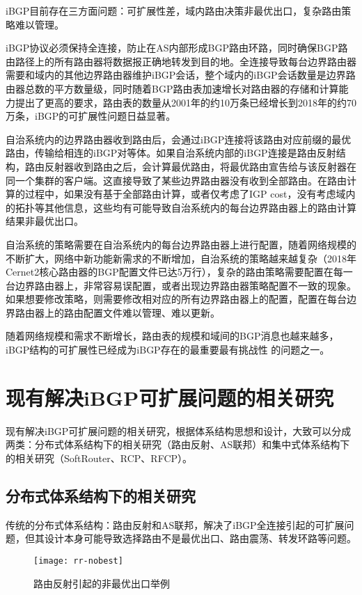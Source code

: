 iBGP\cite{Oprescu2011Rethinking}目前存在三方面问题：可扩展性差，域内路由决策非最优出口，复杂路由策略难以管理。

iBGP协议必须保持全连接，防止在AS内部形成BGP路由环路，同时确保BGP路由路径上的所有路由器将数据报正确地转发到目的地。全连接导致每台边界路由器需要和域内的其他边界路由器维护iBGP会话，整个域内的iBGP会话数量是边界路由器总数的平方数量级，同时随着BGP路由表加速增长对路由器的存储和计算能力提出了更高的要求，路由表的数量从2001年的约10万条已经增长到2018年的约70万条\cite{bgptabedata}，iBGP的可扩展性问题日益显著。

自治系统内的边界路由器收到路由后，会通过iBGP连接将该路由对应前缀的最优路由，传输给相连的iBGP对等体。如果自治系统内部的iBGP连接是路由反射结构，路由反射器收到路由之后，会计算最优路由，将最优路由宣告给与该反射器在同一个集群的客户端。这直接导致了某些边界路由器没有收到全部路由。在路由计算的过程中，如果没有基于全部路由计算，或者仅考虑了IGP cost，没有考虑域内的拓扑等其他信息，这些均有可能导致自治系统内的每台边界路由器上的路由计算结果非最优出口。

自治系统的策略需要在自治系统内的每台边界路由器上进行配置，随着网络规模的不断扩大，网络中新功能新需求的不断增加，自治系统的策略越来越复杂（2018年Cernet2核心路由器的BGP配置文件已达5万行），复杂的路由策略需要配置在每一台边界路由器上，非常容易误配置，或者出现边界路由器策略配置不一致的现象。如果想要修改策略，则需要修改相对应的所有边界路由器上的配置，配置在每台边界路由器上的路由配置文件难以管理、难以更新。

随着网络规模和需求不断增长，路由表的规模和域间的BGP消息也越来越多，iBGP结构的可扩展性已经成为iBGP存在的最重要最有挑战性 的问题之一。


\section{现有解决iBGP可扩展问题的相关研究}
现有解决iBGP可扩展问题的相关研究，根据体系结构思想和设计，大致可以分成两类：分布式体系结构下的相关研究（路由反射\cite{rfc2796}、AS联邦\cite{rfc1965}）和集中式体系结构下的相关研究（SoftRouter\cite{lakshman2004}、RCP\cite{Feamster2004The}、RFCP\cite{Rothenberg}）。

\subsection{分布式体系结构下的相关研究}
传统的分布式体系结构：路由反射和AS联邦，解决了iBGP全连接引起的可扩展问题，但其设计本身可能导致选择路由不是最优出口、路由震荡、转发环路等问题。

\begin{figure}
  \centering
  \texttt{[image: rr-nobest]}
  \caption{路由反射引起的非最优出口举例\cite{Feamster2004The}}
  \label{fig:rr-nobest}
\end{figure}


